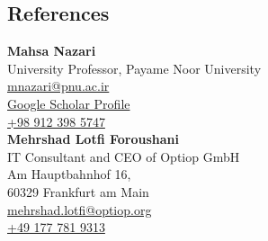\documentclass[../main.tex]{subfiles}
\begin{document}
\begin{category}
\section{References}

\citembullet
\textbf{Mahsa Nazari} \\
University Professor, Payame Noor University \\
\href{mailto:mnazari@pnu.ac.ir}{mnazari@pnu.ac.ir} \\
\href{https://scholar.google.com/citations?view_op=list_works&hl=en&hl=en&user=CRxqpUcAAAAJ}{Google Scholar Profile} \\
\href{tel:+989123985747}{+98 912 398 5747} \\

\textbf{Mehrshad Lotfi Foroushani} \\
IT Consultant and CEO of Optiop GmbH \\
Am Hauptbahnhof 16, \\
60329 Frankfurt am Main \\
\href{mailto:mehrshad.lotfi@optiop.org}{mehrshad.lotfi@optiop.org} \\
\href{tel:+491777819313}{+49 177 781 9313}
\end{category}
\end{document}
